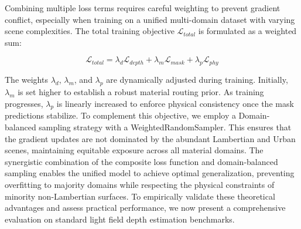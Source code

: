 Combining multiple loss terms requires careful weighting to prevent gradient conflict, especially when training on a unified multi-domain dataset with varying scene complexities. The total training objective $\mathcal{L}_{total}$ is formulated as a weighted sum:

\begin{equation}
\label{eq:eq28}
\mathcal{L}_{total} = \lambda_d \mathcal{L}_{depth} + \lambda_m \mathcal{L}_{mask} + \lambda_p \mathcal{L}_{phy}
\end{equation}

The weights $\lambda_d$, $\lambda_m$, and $\lambda_p$ are dynamically adjusted during training. Initially, $\lambda_m$ is set higher to establish a robust material routing prior. As training progresses, $\lambda_p$ is linearly increased to enforce physical consistency once the mask predictions stabilize. To complement this objective, we employ a Domain-balanced sampling strategy with a WeightedRandomSampler. This ensures that the gradient updates are not dominated by the abundant Lambertian and Urban scenes, maintaining equitable exposure across all material domains. The synergistic combination of the composite loss function and domain-balanced sampling enables the unified model to achieve optimal generalization, preventing overfitting to majority domains while respecting the physical constraints of minority non-Lambertian surfaces. To empirically validate these theoretical advantages and assess practical performance, we now present a comprehensive evaluation on standard light field depth estimation benchmarks.